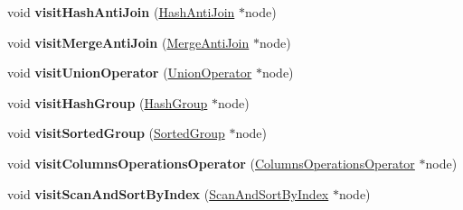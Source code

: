 \begin{DoxyCompactItemize}
\item 
\hypertarget{class_sort_resolving_physical_operator_visitor_a1d9b0afbbf5275b6bdf3adbfea679e82}{void {\bfseries visit\+Hash\+Anti\+Join} (\hyperlink{class_hash_anti_join}{Hash\+Anti\+Join} $\ast$node)}\label{class_sort_resolving_physical_operator_visitor_a1d9b0afbbf5275b6bdf3adbfea679e82}

\item 
\hypertarget{class_sort_resolving_physical_operator_visitor_a81123dee4b2fcf0465b86f94eb1b1b57}{void {\bfseries visit\+Merge\+Anti\+Join} (\hyperlink{class_merge_anti_join}{Merge\+Anti\+Join} $\ast$node)}\label{class_sort_resolving_physical_operator_visitor_a81123dee4b2fcf0465b86f94eb1b1b57}

\item 
\hypertarget{class_sort_resolving_physical_operator_visitor_adced9eb2cd459a8d832dbf4a6811c316}{void {\bfseries visit\+Union\+Operator} (\hyperlink{class_union_operator}{Union\+Operator} $\ast$node)}\label{class_sort_resolving_physical_operator_visitor_adced9eb2cd459a8d832dbf4a6811c316}

\item 
\hypertarget{class_sort_resolving_physical_operator_visitor_a825bb376e6a827d7b45495efcb16f83b}{void {\bfseries visit\+Hash\+Group} (\hyperlink{class_hash_group}{Hash\+Group} $\ast$node)}\label{class_sort_resolving_physical_operator_visitor_a825bb376e6a827d7b45495efcb16f83b}

\item 
\hypertarget{class_sort_resolving_physical_operator_visitor_ae3d9a9443c6dc80abfdb9bee939f7718}{void {\bfseries visit\+Sorted\+Group} (\hyperlink{class_sorted_group}{Sorted\+Group} $\ast$node)}\label{class_sort_resolving_physical_operator_visitor_ae3d9a9443c6dc80abfdb9bee939f7718}

\item 
\hypertarget{class_sort_resolving_physical_operator_visitor_a22bf2c5442c65d923a166269ac45f5ab}{void {\bfseries visit\+Columns\+Operations\+Operator} (\hyperlink{class_columns_operations_operator}{Columns\+Operations\+Operator} $\ast$node)}\label{class_sort_resolving_physical_operator_visitor_a22bf2c5442c65d923a166269ac45f5ab}

\item 
\hypertarget{class_sort_resolving_physical_operator_visitor_aca7c9e51a6d7b86b05633877c4cb3bfb}{void {\bfseries visit\+Scan\+And\+Sort\+By\+Index} (\hyperlink{class_scan_and_sort_by_index}{Scan\+And\+Sort\+By\+Index} $\ast$node)}\label{class_sort_resolving_physical_operator_visitor_aca7c9e51a6d7b86b05633877c4cb3bfb}


\end{DoxyCompactItemize}
